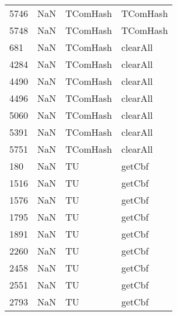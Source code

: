 \begin{tabular}{llll}
5746 &                   NaN &                   TComHash &                                  TComHash \\
5748 &                   NaN &                   TComHash &                                  TComHash \\
681  &                   NaN &                   TComHash &                                  clearAll \\
4284 &                   NaN &                   TComHash &                                  clearAll \\
4490 &                   NaN &                   TComHash &                                  clearAll \\
4496 &                   NaN &                   TComHash &                                  clearAll \\
5060 &                   NaN &                   TComHash &                                  clearAll \\
5391 &                   NaN &                   TComHash &                                  clearAll \\
5751 &                   NaN &                   TComHash &                                  clearAll \\
180  &                   NaN &                         TU &                                    getCbf \\
1516 &                   NaN &                         TU &                                    getCbf \\
1576 &                   NaN &                         TU &                                    getCbf \\
1795 &                   NaN &                         TU &                                    getCbf \\
1891 &                   NaN &                         TU &                                    getCbf \\
2260 &                   NaN &                         TU &                                    getCbf \\
2458 &                   NaN &                         TU &                                    getCbf \\
2551 &                   NaN &                         TU &                                    getCbf \\
2793 &                   NaN &                         TU &                                    getCbf \\

\end{tabular}
